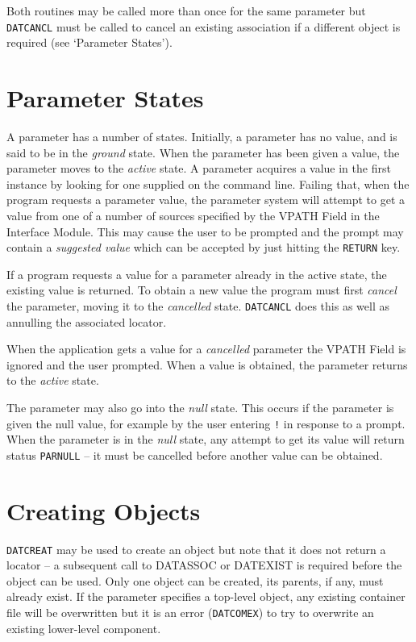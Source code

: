 \documentclass[twoside,11pt]{article}
\newcommand{\htmlref}[2]{#1}
\newcommand{\xref}[3]{#1}
\newcommand{\xlabel}[1]{}
\renewcommand{\_}{\texttt{\symbol{95}}}
\begin{document}
Both routines may be called more than once for the same parameter but
\texttt{DAT\_CANCL} must be called to cancel an existing association if a
different object is required (see
\htmlref{`Parameter States'}{parameter_states}).

\section{\xlabel{parameter_states}Parameter States\label{parameter_states}}
A parameter has a number of states.  Initially, a parameter has no
value, and is said to be in the \textit{ground\/} state.  When the
parameter has been given a value, the parameter moves to the \textit{active\/}
state.  A parameter acquires a value in the first instance by
looking for one supplied on the command line.  Failing that, when the program
requests a parameter value, the parameter system will attempt to get a value
from one of a number of sources specified by
\xref{the VPATH Field}{sun115}{the_vpath_field}
in the Interface Module.
This may cause the user to be prompted and the prompt may contain a
\textit{suggested value} which can be accepted by just hitting the
\texttt{RETURN} key.

If a program requests a value for a parameter already in the active state,
the existing value is returned.
To obtain a new value the program must first \textit{cancel\/} the
parameter, moving it to the \textit{cancelled\/} state.
\htmlref{\texttt{DAT\_CANCL}}{DAT_CANCL} does this as well as annulling the
associated locator.

When the application gets a value for a \textit{ cancelled\/} parameter
\xref{the VPATH Field}{sun115}{the_vpath_field}
is ignored and the user prompted. When a value is obtained, the parameter
returns to the \textit{ active\/} state.

The parameter may also go into the \textit{null\/} state. This occurs if the
parameter is given the null value, for example by the user entering \texttt{!}
in response to a prompt. When the parameter is in the \textit{null\/} state,
any attempt to get its value will return status \texttt{PAR\_\_NULL} -- it
must be cancelled before another value can be obtained.


\section{\xlabel{creating_objects}Creating Objects}
\htmlref{\texttt{DAT\_CREAT}}{DAT_CREAT} may be used to create an object but
note that it does not return a locator -- a subsequent call to DAT\_ASSOC
or DAT\_EXIST is required before the object can be used.
Only one object can be created, its parents, if any, must already exist.
If the parameter specifies a top-level object, any existing container file will
be overwritten but it is an error (\texttt{DAT\_\_COMEX}) to try to overwrite
an existing lower-level component.
\end{document}
